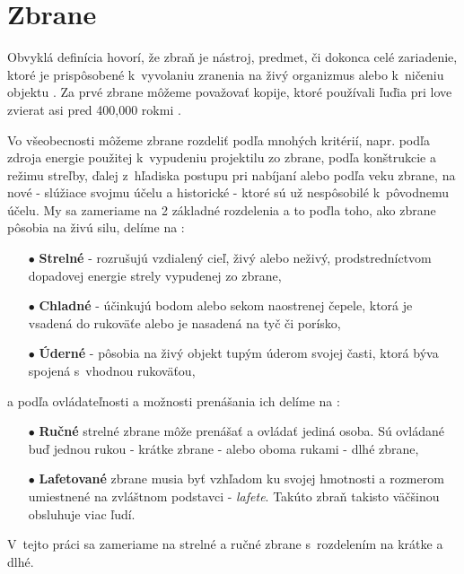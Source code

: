 
\section{Zbrane}
\label{sec:weapons}
Obvyklá definícia hovorí, že zbraň je nástroj, predmet, či dokonca celé zariadenie,
ktoré je prispôsobené k~vyvolaniu zranenia na živý organizmus alebo k~ničeniu objektu \cite{book:StrelneZbrane}.
Za prvé zbrane môžeme považovať kopije, ktoré používali ľuďia pri love zvierat asi pred 400,000 rokmi \cite{prop:SpearHistory}.

Vo všeobecnosti môžeme zbrane rozdeliť podľa mnohých kritérií, napr. podľa zdroja energie použitej k~vypudeniu projektilu zo zbrane,
podľa konštrukcie a režimu streľby, ďalej z~hľadiska postupu pri nabíjaní alebo podľa veku zbrane, na nové - slúžiace svojmu účelu a historické - ktoré sú už nespôsobilé k~pôvodnemu účelu.
My sa zameriame na 2 základné rozdelenia a to poďla toho, ako zbrane pôsobia na živú silu, delíme na \cite{book:StrelneZbrane}:
\begin{enumerate}
	\item[$\bullet$] \textbf{Strelné} - rozrušujú vzdialený cieľ, živý alebo neživý, prodstredníctvom dopadovej energie strely vypudenej zo zbrane,
	\item[$\bullet$] \textbf{Chladné} - účinkujú bodom alebo sekom naostrenej čepele, ktorá je vsadená do rukoväťe alebo je nasadená na tyč či porísko,
    \item[$\bullet$] \textbf{Úderné} - pôsobia na živý objekt tupým úderom svojej časti, ktorá býva spojená s~vhodnou rukoväťou,
\end{enumerate}
a podľa ovládateľnosti a možnosti prenášania ich delíme na \cite{book:StrelneZbrane}:
\begin{enumerate}
	\item[$\bullet$] \textbf{Ručné} strelné zbrane môže prenášať a ovládať jediná osoba. Sú ovládané buď jednou rukou - krátke zbrane - alebo oboma rukami - dlhé zbrane,
	\item[$\bullet$] \textbf{Lafetované} zbrane musia byť vzhľadom ku svojej hmotnosti a rozmerom umiestnené na zvláštnom podstavci - \textit{lafete}. Takúto zbraň takisto väčšinou obsluhuje viac ľudí.
\end{enumerate}
V~tejto práci sa zameriame na strelné a ručné zbrane s~rozdelením na krátke a dlhé.
